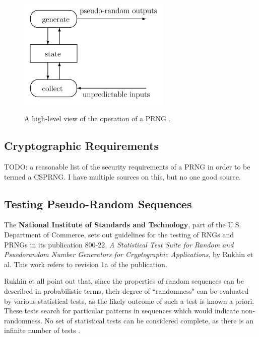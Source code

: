 \documentclass[12pt, titlepage]{report}
\theoremstyle{definition}
\begin{document}
\begin{figure}
\centering
\includegraphics[width=0.65\textwidth]{img/prng_high_level.png}\\
\caption{A high-level view of the operation of a PRNG \cite{kelsey1998cryptanalytic}.}
\label{figure:prng_high_level}
\end{figure}
	


\subsection{Cryptographic Requirements}
TODO: a reasonable list of the security requirements of a PRNG in order to be termed a CSPRNG. I have multiple sources on this, but no one good source.



\subsection{Testing Pseudo-Random Sequences}
The \textbf{National Institute of Standards and Technology}, part of the U.S. Department of Commerce, sets out guidelines for the testing of RNGs and PRNGs in its publication 800-22, \textit{A Statistical Test Suite for Random and Psuedorandom Number Generators for Cryptographic Applications}, by Rukhin et al. This work refers to revision 1a of the publication.

Rukhin et all point out that, since the properties of random sequences can be described in probabilistic terms, their degree of ``randomness" can be evaluated by various statistical tests, as the likely outcome of such a test is known a priori. These tests search for particular patterns in sequences which would indicate non-randomness. No set of statistical tests can be considered complete, as there is an infinite number of tests \cite[p. 1-2]{rukhin2001statistical}.
\end{document}
